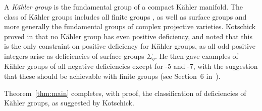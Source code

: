 \documentclass[a4paper,12pt]{amsart}
\theoremstyle{plain}
\theoremstyle{definition}
\begin{document}
A \emph{Kähler group} is the fundamental group of a compact Kähler manifold.
The class of Kähler groups includes all finite groups \cite{serre}, as well as surface groups and more generally the fundamental groups of complex projective varieties.
Kotschick proved in \cite{kotschick} that no Kähler group has even positive deficiency, and noted that this is the only constraint on positive deficiency for Kähler groups, as all odd positive integers arise as deficiencies of surface groups $\Sigma_g$.
He then gave examples of Kähler groups of all negative deficiencies except for -5 and -7, with the suggestion that these should be achievable with finite groups (see Section~6 in~\cite{kotschick}).

Theorem~\ref{thm:main} completes, with proof, the classification of deficiencies of Kähler groups, as suggested by Kotschick.
\end{document}
